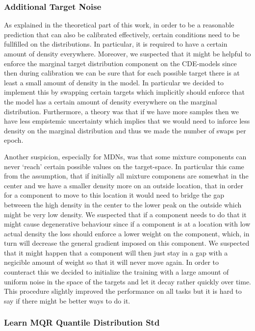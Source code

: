\subsubsection{Additional Target Noise}

As explained in the theoretical part of this work, in order to be a reasonable prediction that can also be calibrated effectively, certain conditions need to be fullfilled on the distributions. In particular, it is required to have a certain amount of density everywhere. Moreover, we suspected that it might be helpful to enforce the marginal target distribution component on the CDE-models since then during calibration we can be sure that for each possible target there is at least a small amount of density in the model. In particular we decided to implement this by swapping certain targets which implicitly should enforce that the model has a certain amount of density everywhere on the marginal distribution. Furthermore, a theory was that if we have more samples then we have less empistemic uncertainty which implies that we would need to inforce less density on the marginal distribution and thus we made the number of swaps per epoch.

Another suspicion, especially for MDNs, was that some mixture components can never `reach' certain possible values on the target-space. In particular this came from the assumption, that if initially all mixture componens are somewhat in the center and we have a smaller density more on an outside location, that in order for a component to move to this location it would need to bridge the gap betweeen the high density in the center to the lower peak on the outside which might be very low density. We suspected that if a component needs to do that it might cause degenerative behaviour since if a component is at a location with low actual density the loss should enforce a lower weight on the component, which, in turn will decrease the general gradient imposed on this component. We suspected that it might happen that a component will then just stay in a gap with a negicible amount of weight so that it will never move again. In order to counteract this we decided to initialize the training with a large amount of uniform noise in the space of the targets and let it decay rather quickly over time. This procedure slightly improved the performance on all tasks but it is hard to say if there might be better ways to do it.

\subsubsection{Learn MQR Quantile Distribution Std}\label{sec:learn_mqr_quantile_std}

